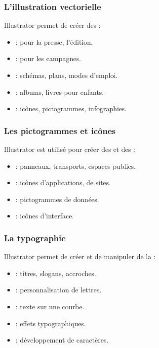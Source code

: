 \subsubsection{L'illustration vectorielle}

Illustrator permet de créer des  :

\begin{itemize}
    \item {} : pour la presse, l'édition.
    \item {} : pour les campagnes.
    \item {} : schémas, plans, modes d'emploi.
    \item {} : albums, livres pour enfants.
    \item {} : icônes, pictogrammes, infographies.
\end{itemize}

\subsubsection{Les pictogrammes et icônes}

Illustrator est utilisé pour créer des  et des  :

\begin{itemize}
    \item {} : panneaux, transports, espaces publics.
    \item {} : icônes d'applications, de sites.
    \item {} : pictogrammes de données.
    \item {} : icônes d'interface.
\end{itemize}

\subsubsection{La typographie}

Illustrator permet de créer et de manipuler de la  :

\begin{itemize}
    \item {} : titres, slogans, accroches.
    \item {} : personnalisation de lettres.
    \item {} : texte sur une courbe.
    \item {} : effets typographiques.
    \item {} : développement de caractères.
\end{itemize}

